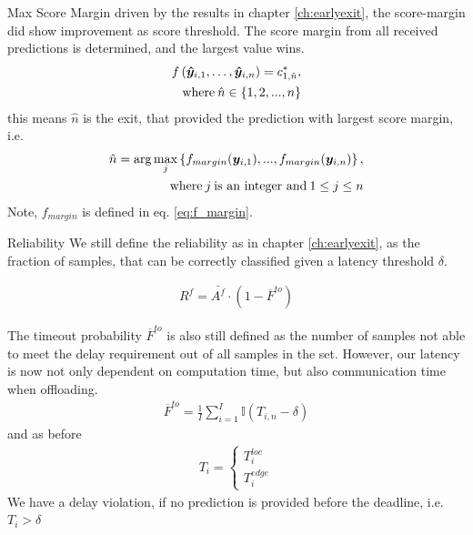 \begin{enumdescript}
\begin{enumdescript}
			\item[Max Score Margin] driven by the results in chapter \ref{ch:earlyexit}, the score-margin did show improvement as score threshold. The score margin from all received predictions is determined, and the largest value wins.
			\begin{align}
			\begin{split}
			f\left(\bm{\hat{y}}_{i,1}, \dots, \bm{\hat{y}}_{i,n} \right) =c^*_{1,\hat{n}},\\
			\text{where\:} \hat{n} \in \{1, 2, ..., n\}
			\end{split}	
			\end{align}
			this means $ \hat{n} $ is the exit, that provided the prediction with largest score margin, i.e.
			\begin{align*}
			\begin{split}
				\hat{n} = \arg \underset{j}{\max} \left\{f_{margin}(\bm{y}_{i,1}), ..., f_{margin}(\bm{y}_{i,n})\right\} ,\\
				\text{where\:} j \text{\:is an integer and\:} 1 \le j \le n
			\end{split}
			\end{align*}
			Note, $ f_{margin} $ is defined in eq. \ref{eq:f_margin}.
		\end{enumdescript}
	
		\item[Reliability]  We still define the reliability as in chapter \ref{ch:earlyexit}, as the fraction of samples, that can be correctly classified given a latency threshold $ \delta $.
		
		\begin{align}
		R^f= \bar{A^f} \cdot (1-\overline{F}^{to})
		\end{align}
		
		The timeout probability $ \overline{F}^{to} $ is also still defined as the number of samples not able to meet the delay requirement out of all samples in the set. However, our latency is now not only dependent on computation time, but also communication time when offloading.
		\begin{align}
		\overline{F}^{to}=\frac{1}{I}\sum_{i=1}^{I} \mathbb{I}\left(T_{i,n}-\delta\right)
		\end{align}
		and as before
		\begin{align*}
			T_{i} = \begin{cases}
				T_{i}^{loc} \\
				T_{i}^{edge}
			\end{cases}
		\end{align*}
		We have a delay violation, if no prediction is provided before the deadline, i.e. $ T_{i} > \delta $  
	

\end{enumdescript}
